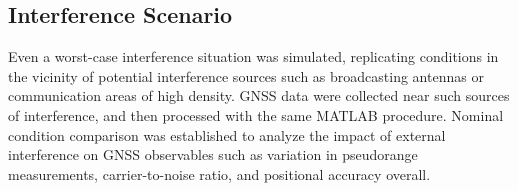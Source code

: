     \subsection{Interference Scenario}
    
        Even a worst-case interference situation was simulated, replicating conditions in the vicinity of potential interference sources such as broadcasting antennas or communication areas of high density. 
        GNSS data were collected near such sources of interference, and then processed with the same MATLAB procedure. 
        Nominal condition comparison was established to analyze the impact of external interference on GNSS observables such as variation in pseudorange measurements, carrier-to-noise ratio, and positional accuracy overall.
